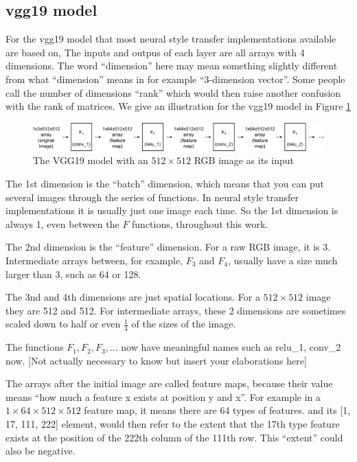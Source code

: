 \documentclass[runningheads]{llncs}
\begin{document}
\subsection{vgg19 model}
For the vgg19 model that most neural style transfer implementations available are based on,
The inputs and outpus of each layer are all arrays with 4 dimensions.
The word ``dimension'' here may mean something slightly different from what ``dimension'' means in
for example ``$3$-dimension vector''. 
Some people call the number of dimensions ``rank'' which would then raise another confusion with the rank of matrices.
We give an illustration for the vgg19 model in Figure \ref{vgg512}
\begin{figure}
\center
\includegraphics[width=\textwidth]{vgg512.pdf}
\caption{The VGG19 model with an $512\times512$ RGB image as its input \label{vgg512}}
\end{figure}

The 1st dimension is the ``batch'' dimension, which means that you can put several images through the
series of functions.
In neural style transfer implementations it is usually just one image each time.
So the 1st dimension is always 1, even between the $F$ functions, throughout this work.

The 2nd dimension is the ``feature'' dimension. For a raw RGB image, it is 3.
Intermediate arrays between, for example, $F_3$ and $F_4$, usually 
have a size much larger than 3, such as 64 or 128.

The 3nd and 4th dimensions are just spatial locations. 
For a $512\times512$ image they are 512 and 512. 
For intermediate arrays, these 2 dimensions are sometimes scaled down
to half or even $\frac{1}{4}$ of the sizes of the image.

The functions $F_1,F_2,F_3,...$ now have meaningful names such as relu\_1, conv\_2 now.
[Not actually necessary to know but insert your elaborations here]

The arrays after the initial image are called feature maps, because their value means
``how much a feature x exists at position y and x''.
For example in a $1\times64\times512\times512$ feature map, it means there are 64 types of features.
and its [1, 17, 111, 222] element, would then refer to the extent that the 17th type feature exists
at the position of the 222th column of the 111th row. This ``extent'' could also be negative.
\end{document}
